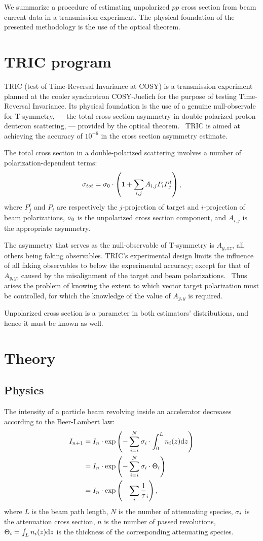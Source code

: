 \documentclass[reprint]{revtex4-1}
\newcommand{\td}{\mathrm{d}}
\begin{document}
\begin{abstractname}
We summarize a procedure of estimating unpolarized $pp$ cross section from beam current data in a transmission experiment. The  physical foundation of the presented methodology is the use of the optical theorem.
\end{abstractname}

\section{TRIC program}

TRIC (test of Time-Reversal Invariance at COSY) is a transmission experiment planned at the cooler synchrotron COSY-Juelich for the purpose of testing Time-Reversal Invariance. Its physical foundation is the use of a genuine null-observale for T-symmetry, --- the total cross section asymmetry in double-polarized proton-deuteron scattering, --- provided by the optical theorem.~\cite{Conzett} TRIC is aimed at achieving the accuracy of $10^{-6}$ in the cross section asymmetry estimate.

The total cross section in a double-polarized scattering involves a number of polarization-dependent terms:
\[
	\CS[tot] = \CS[0]\cdot\bkt{1 + \sum_{i,j} A_{i,j} P_iP^t_j},
\]
where $P^t_j$ and $P_i$ are respectively the $j$-projection of target and $i$-projection of beam polarizations, $\CS[0]$ is the unpolarized cross section component, and $A_{i,j}$ is the appropriate asymmetry.

The asymmetry that serves as the null-observable of T-symmetry is $A_{y,xz}$, all others being faking observables. TRIC's experimental design limits the influence of all faking observables to below the experimental accuracy; except for that of $A_{y,y}$, caused by the misalignment of the target and beam polarizations.~\cite[p. 11]{Proposal} Thus arises the problem of knowing the extent to which vector target polarization must be controlled, for which the knowledge of the value of $A_{y,y}$ is required. 

Unpolarized cross section is a parameter in both estimators' distributions, and hence it must be known as well. 

\section{Theory}
\subsection{Physics}
The intensity of a particle beam revolving inside an accelerator decreases according to the Beer-Lambert law:
\begin{align*}
	I_{n+1} &= I_n \cdot \exp\bkt{-\sum_{i=i}^N \CS[i]\cdot\int_0^L n_i(z)\td z} \\
			&= I_n \cdot \exp\bkt{-\sum_{i=i}^N \CS[i]\cdot \Thick[i]} \\
			&= I_n \cdot \exp\bkt{-\sum_i\frac1\tau_i},
\end{align*}
where $L$ is the beam path length, $N$ is the number of attenuating species, $\CS[i]$ is the attenuation cross section, $n$ is the number of passed revolutions, $\Thick[i] = \int_L n_i(z)\td z$ is the thickness of the corresponding attenuating species.
\end{document}
